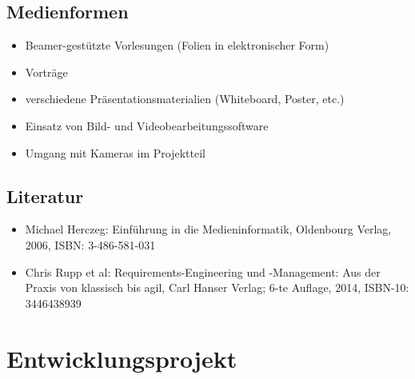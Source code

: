 \hypertarget{medienformenpathlabelmi-2017modulbeschreibungen-bachelorba_einfhrungindiemedieninformatik}{%
\section*{Medienformen\label{/mi-2017/modulbeschreibungen-bachelor/BA_EinfhrungindieMedieninformatik}}\label{medienformenpathlabelmi-2017modulbeschreibungen-bachelorba_einfhrungindiemedieninformatik}}

\begin{itemize}
\tightlist
\item
  Beamer-gestützte Vorlesungen (Folien in elektronischer Form)
\item
  Vorträge
\item
  verschiedene Präsentationsmaterialien (Whiteboard, Poster, etc.)
\item
  Einsatz von Bild- und Videobearbeitungssoftware
\item
  Umgang mit Kameras im Projektteil
\end{itemize}

\hypertarget{literaturpathlabelmi-2017modulbeschreibungen-bachelorba_einfhrungindiemedieninformatik}{%
\section*{Literatur\label{/mi-2017/modulbeschreibungen-bachelor/BA_EinfhrungindieMedieninformatik}}\label{literaturpathlabelmi-2017modulbeschreibungen-bachelorba_einfhrungindiemedieninformatik}}

\begin{itemize}
\tightlist
\item
  Michael Herczeg: Einführung in die Medieninformatik, Oldenbourg
  Verlag, 2006, ISBN: 3-486-581-031
\item
  Chris Rupp et al: Requirements-Engineering und -Management: Aus der
  Praxis von klassisch bis agil, Carl Hanser Verlag; 6-te Auflage, 2014,
  ISBN-10: 3446438939
\end{itemize}

\hypertarget{entwicklungsprojektpathlabelmi-2017modulbeschreibungen-bachelorba_entwicklungsprojekt}{%
\chapter{Entwicklungsprojekt\label{/mi-2017/modulbeschreibungen-bachelor/BA_Entwicklungsprojekt}}\label{entwicklungsprojektpathlabelmi-2017modulbeschreibungen-bachelorba_entwicklungsprojekt}}

